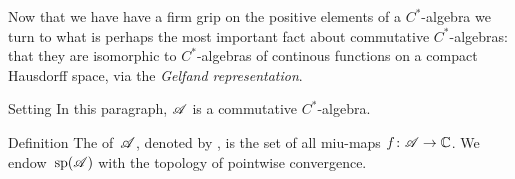 \documentclass[a]{subfiles}
\begin{document}
\begin{parsec}%
\begin{point}%
Now that we have have a firm grip
on the positive elements of a $C^*$-algebra
we turn to what is perhaps the most important
fact about commutative $C^*$-algebras:
that they are isomorphic to $C^*$-algebras
of continous functions on a compact Hausdorff space,
via the \emph{Gelfand representation}.

\end{point}
\begin{point}{Setting}%
In this paragraph,
$\mathscr{A}$ is a commutative $C^*$-algebra.
\end{point}
\begin{point}{Definition}%
The  of~$\mathscr{A}$,
denoted by \Define{$\spec(\scrA)$},
is the set of all miu-maps $f\colon \mathscr{A}\to \mathbb{C}$.
We endow~$\spec(\scrA)$
with the topology of pointwise convergence.


\end{point}
\end{parsec}
\end{document}
